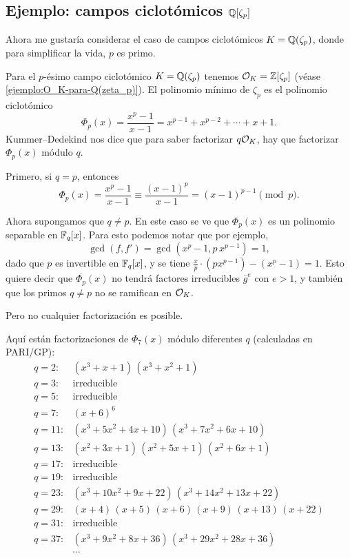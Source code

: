 \subsection{Ejemplo: campos ciclotómicos $\mathbb{Q} [\zeta_p]$}

Ahora me gustaría considerar el caso de campos ciclotómicos $K = \mathbb{Q} (\zeta_p)$,
donde para simplificar la vida, $p$ es primo.

Para el $p$-ésimo campo ciclotómico $K = \mathbb{Q} (\zeta_p)$ tenemos
$\mathcal{O}_K = \mathbb{Z} [\zeta_p]$ (véase \ref{ejemplo:O_K-para-Q(zeta_p)}). El polinomio
mínimo de $\zeta_p$ es el polinomio ciclotómico
$$\Phi_p (x) = \frac{x^p - 1}{x-1} = x^{p-1} + x^{p-2} + \cdots + x + 1.$$
Kummer--Dedekind nos dice que para saber factorizar $q\mathcal{O}_K$, hay que
factorizar $\Phi_p (x)$ módulo $q$.

Primero, si $q = p$, entonces
\[ \Phi_p (x) = \frac{x^p - 1}{x-1} \equiv \frac{(x - 1)^p}{x-1} =
   (x-1)^{p-1} \pmod{p}. \]

Ahora supongamos que $q \ne p$. En este caso se ve que $\Phi_p (x)$ es un
polinomio separable en $\mathbb{F}_q [x]$. Para esto podemos notar que por ejemplo,
$$\gcd (f,f') = \gcd (x^p - 1, p\,x^{p-1}) = 1,$$
dado que $p$ es invertible en $\mathbb{F}_q [x]$, y se tiene
$\frac{x}{p} \cdot (p x^{p-1}) - (x^p - 1) = 1$. Esto quiere decir que
$\overline{\Phi_p} (x)$ no tendrá factores irreducibles $\overline{g}^e$ con
$e > 1$, y también que los primos $q \ne p$ no se ramifican en $\mathcal{O}_K$.

Pero no cualquier factorización es posible.

\begin{ejemplo}
  Aquí están factorizaciones de $\Phi_7 (x)$ módulo diferentes $q$ (calculadas
  en PARI/GP):
  \begin{align*}
    q = 2\colon & (x^3 + x + 1)\,(x^3 + x^2 + 1) \\
    q = 3\colon & \text{irreducible} \\
    q = 5\colon & \text{irreducible} \\
    q = 7\colon & (x + 6)^6 \\
    q = 11\colon & (x^3 + 5x^2 + 4x + 10)\,(x^3 + 7x^2 + 6x + 10) \\
    q = 13\colon & (x^2 + 3x + 1)\,(x^2 + 5x + 1)\,(x^2 + 6x + 1) \\
    q = 17\colon & \text{irreducible} \\
    q = 19\colon & \text{irreducible} \\
    q = 23\colon & (x^3 + 10x^2 + 9x + 22)\,(x^3 + 14x^2 + 13x + 22) \\
    q = 29\colon & (x + 4)\,(x + 5)\,(x + 6)\,(x + 9)\,(x + 13)\,(x + 22) \\
    q = 31\colon & \text{irreducible} \\
    q = 37\colon & (x^3 + 9x^2 + 8x + 36)\,(x^3 + 29x^2 + 28x + 36) \\
    & \cdots
  \end{align*}
\end{ejemplo}

